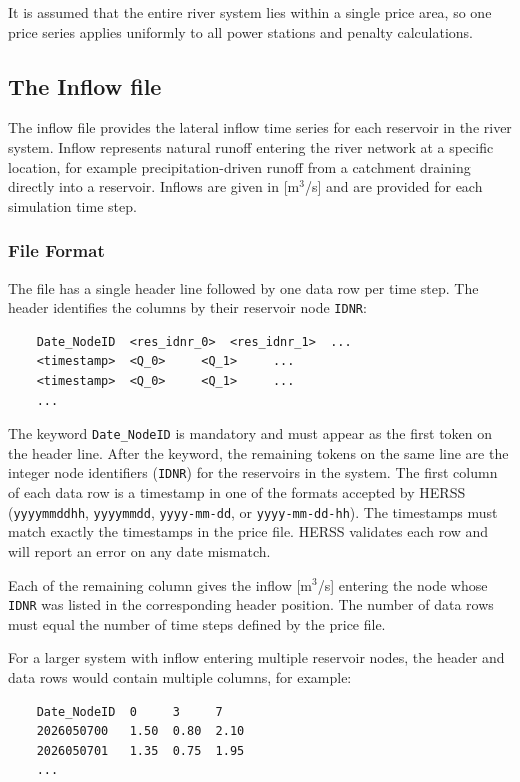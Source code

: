 \documentclass[a4paper, 12pt]{report}
\begin{document}
	It is assumed that the entire river system lies within a single price area, so one price
	series applies uniformly to all power stations and penalty calculations.

	\subsection{The Inflow file}
	\label{sec:inflowfile}

	The inflow file provides the lateral inflow time series for each reservoir in the river system. Inflow represents natural runoff entering the river network at a specific location, for	example precipitation-driven runoff from a catchment draining directly into a reservoir.
	Inflows are given in [m$^3$/s] and are provided for each simulation time step.

	\subsubsection{File Format}
	The file has a single header line followed by one data row per time step. The header
	identifies the columns by their reservoir node \texttt{IDNR}:

	\begin{verbatim}
	Date_NodeID  <res_idnr_0>  <res_idnr_1>  ...
	<timestamp>  <Q_0>     <Q_1>     ...
	<timestamp>  <Q_0>     <Q_1>     ...
	...
	\end{verbatim}

	The keyword \texttt{Date\_NodeID} is mandatory and must appear as the first token
	on the header line. After the keyword, the remaining tokens on the same line are
	the integer node identifiers (\texttt{IDNR}) for the reservoirs in the system. 
	The first column of each data row is a timestamp in one of the
	formats accepted by HERSS (\texttt{yyyymmddhh}, \texttt{yyyymmdd},
	\texttt{yyyy-mm-dd}, or \texttt{yyyy-mm-dd-hh}). The timestamps must match
	exactly the timestamps in the price file. HERSS validates each row and will
	report an error on any date mismatch.
	
	Each of the remaining column gives the inflow [m$^3$/s] entering the
	node whose \texttt{IDNR} was listed in the corresponding header position.
	The number of data rows must equal the number of time steps defined by the price file.

	For a larger system with inflow entering multiple reservoir nodes, the header and data rows would contain multiple columns, for example:

	\begin{verbatim}
	Date_NodeID  0     3     7
	2026050700   1.50  0.80  2.10
	2026050701   1.35  0.75  1.95
	...
	\end{verbatim}
\end{document}
